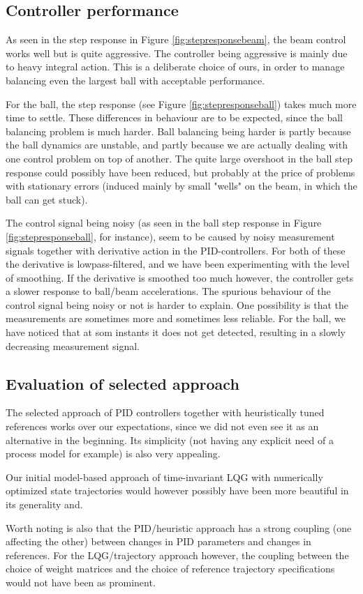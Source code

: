 
\subsection{Controller performance}
As seen in the step response in Figure \ref{fig:stepresponsebeam}, the beam control works well but is quite aggressive.
The controller being aggressive is mainly due to heavy integral action.
This is a deliberate choice of ours, in order to manage balancing even the largest ball with acceptable performance.

For the ball, the step response (see Figure \ref{fig:stepresponseball}) takes much more time to settle.
These differences in behaviour are to be expected, since the ball balancing problem is much harder.
Ball balancing being harder is partly because the ball dynamics are unstable, and partly because we are actually dealing with one control problem on top of another.
The quite large overshoot in the ball step response could possibly have been reduced, but probably at the price of problems with stationary errors (induced mainly by small "wells" on the beam, in which the ball can get stuck).

The control signal being noisy (as seen in the ball step response in Figure \ref{fig:stepresponseball}, for instance), seem to be caused by noisy measurement signals together with derivative action in the PID-controllers.
For both of these the derivative is lowpass-filtered, and we have been experimenting with the level of smoothing. If the derivative is smoothed too much however, the controller gets a slower response to ball/beam accelerations.
The spurious behaviour of the control signal being noisy or not is harder to explain.
One possibility is that the measurements are sometimes more and sometimes less reliable.
For the ball, we have noticed that at som instants it does not get detected, resulting in a slowly decreasing measurement signal.

\subsection{Evaluation of selected approach}
The selected approach of PID controllers together with heuristically tuned references works over our expectations, since we did not even see it as an alternative in the beginning. Its simplicity (not having any explicit need of a process model for example) is also very appealing.

Our initial model-based approach of time-invariant LQG with numerically optimized state trajectories would however possibly have been more beautiful in its generality and.

Worth noting is also that the PID/heuristic approach has a strong coupling (one affecting the other) between changes in PID parameters and changes in references. For the LQG/trajectory approach however, the coupling between the choice of weight matrices and the choice of reference trajectory specifications would not have been as prominent.


